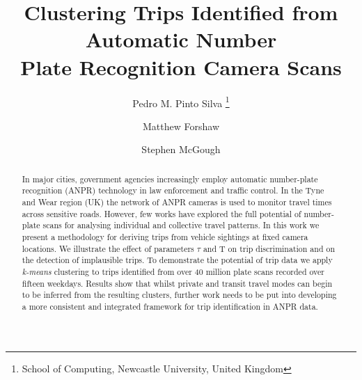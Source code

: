 \documentclass[twoside,leqno,twocolumn]{article}
\newcommand{\Tau}{\mathrm{T}}
\begin{document}

\title{\Large Clustering Trips Identified from Automatic Number \\ Plate Recognition Camera Scans}
\author{Pedro M. Pinto Silva \thanks{School of Computing, Newcastle University, United Kingdom}
\and
Matthew Forshaw\footnotemark[1]
\and
Stephen McGough\footnotemark[1]}
\date{}

\maketitle








\begin{abstract} \small\baselineskip=9pt In major cities, government agencies increasingly employ automatic number-plate recognition (ANPR) technology in law enforcement and traffic control. In the Tyne and Wear region (UK) the network of ANPR cameras is used to monitor travel times across sensitive roads. However, few works have explored the full potential of number-plate scans for analysing individual and collective travel patterns. In this work we present a methodology for deriving trips from vehicle sightings at fixed camera locations. We illustrate the effect of parameters $\tau$ and $\Tau$ on trip discrimination and on the detection of implausible trips. To demonstrate the potential of trip data we apply \emph{k-means} clustering to trips identified from over 40 million plate scans recorded over fifteen weekdays. Results show that whilst private and transit travel modes can begin to be inferred from the resulting clusters, further work needs to be put into developing a more consistent and integrated framework for trip identification in ANPR data.\end{abstract}
\end{document}

